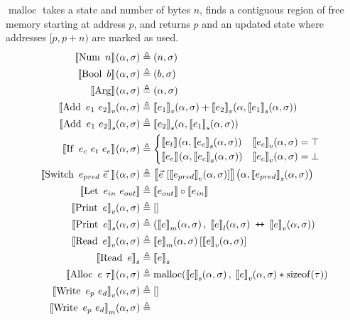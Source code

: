 $\operatorname{malloc}$ takes a state and number of bytes $n$, finds a contiguous region of free memory starting at address $p$, and returns $p$ and an updated state where addresses $[p,p+n)$ are marked as used.
\begin{align*}
\denotef{\uop{Num}{n}}{\targ,\tmem} &\eqdef
  \left(n,\tmem\right)\\
%
\denotef{\uop{Bool}{b}}{\targ,\tmem} &\eqdef
  \left(b,\tmem\right)\\
%
\denotef{\mathrm{Arg}}{\targ,\tmem} &\eqdef
  \left(\targ,\tmem\right)\\
%
\denotefv{\bop{Add}{e_1}{e_2}}{\targ,\tmem} &\eqdef
  \denotefv{e_1}{\targ,\tmem} +
  \denotefv{e_2}{\targ,\denotefs{e_1}{\targ,\tmem}}\\
%
\denotefs{\bop{Add}{e_1}{e_2}}{\targ,\tmem} &\eqdef
  \denotefs{e_2}{\targ,\denotefs{e_1}{\targ,\tmem}}\\
%
\denotef{\trop{If}{e_c}{e_t}{e_e}}{\targ,\tmem} &\eqdef
  \begin{cases}
    \denotef{e_t}{\targ,\denotefs{e_c}{\targ,\tmem}} &
      \denotefv{e_c}{\targ,\tmem} = \top\\
    \denotef{e_e}{\targ,\denotefs{e_c}{\targ,\tmem}} &
      \denotefv{e_c}{\targ,\tmem} = \bot
  \end{cases}\\
%
\denotef{\bop{Switch}{e_{pred}}{\Vec{e}\ }}{\targ,\tmem} &\eqdef
  \denotef{\Vec{e}\ [\denotefv{e_{pred}}{\targ,\tmem}]}{\targ,\denotefs{e_{pred}}{\targ,\tmem}}\\
%
\denote{\bop{Let}{e_{in}}{e_{out}}} &\eqdef
  \denote{e_{out}} \circ \denote{e_{in}}\\
%
\denotefv{\uop{Print}{e}}{\targ,\tmem} &\eqdef []\\
\denotefs{\uop{Print}{e}}{\targ,\tmem} &\eqdef
  (\denotefsub{m}{e}{\targ,\tmem},\;
   \append{\denotefsub{l}{e}{\targ,\tmem}}{\denotefv{e}{\targ,\tmem}})\\
%
\denotefv{\uop{Read}{e}}{\targ,\tmem} &\eqdef
  \denotefsub{m}{e}{\targ,\tmem}[\denotefv{e}{\targ,\tmem}]\\
%
\denotestate{\uop{Read}{e}} &\eqdef \denotestate{e}\\
%
\denotef{\bop{Alloc}{e}{\tau}}{\targ,\tmem} &\eqdef \operatorname{malloc}(\denotefs{e}{\targ,\tmem},\; \denotefv{e}{\targ,\tmem} * \operatorname{sizeof}(\tau))\\
%
\denotefv{\bop{Write}{e_p}{e_d}}{\targ,\tmem} &\eqdef []\\
%
\denotefsub{m}{\bop{Write}{e_p}{e_d}}{\targ,\tmem} &\eqdef

\end{align*}
